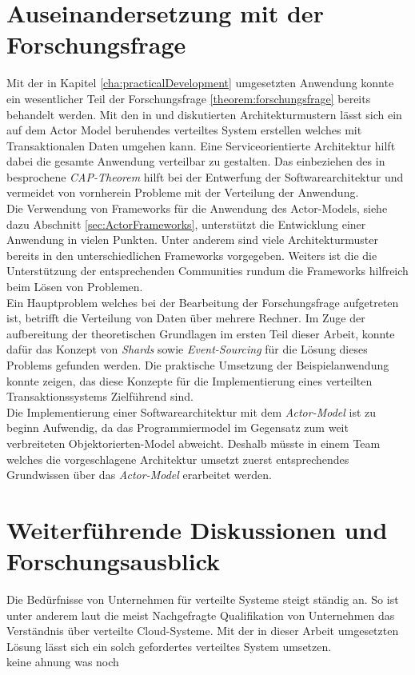 \section{Auseinandersetzung mit der Forschungsfrage}
Mit der in Kapitel \ref{cha:practicalDevelopment} umgesetzten Anwendung konnte ein wesentlicher Teil der Forschungsfrage \ref{theorem:forschungsfrage} bereits behandelt werden. Mit den in \cite{Vernon2015ReactiveAkka} und \cite{akkaInAction} diskutierten Architekturmustern lässt sich ein auf dem Actor Model beruhendes verteiltes System erstellen welches mit Transaktionalen Daten umgehen kann. Eine Serviceorientierte Architektur hilft dabei die gesamte Anwendung verteilbar zu gestalten. 
Das einbeziehen des in \cite{gilbertPerspectiveCAPTheorem2012} besprochene \textit{CAP-Theorem} hilft bei der Entwerfung der Softwarearchitektur und vermeidet von vornherein Probleme mit der Verteilung der Anwendung. \\
Die Verwendung von Frameworks für die Anwendung des Actor-Models, siehe dazu Abschnitt \ref{sec:ActorFrameworks}, unterstützt die Entwicklung einer Anwendung in vielen Punkten. Unter anderem sind viele Architekturmuster bereits in den unterschiedlichen Frameworks vorgegeben. Weiters ist die die Unterstützung der entsprechenden Communities rundum die Frameworks hilfreich beim Lösen von Problemen. \\
Ein Hauptproblem welches bei der Bearbeitung der Forschungsfrage aufgetreten ist, betrifft die Verteilung von Daten über mehrere Rechner. Im Zuge der aufbereitung der theoretischen Grundlagen im ersten Teil dieser Arbeit, konnte dafür das Konzept von \textit{Shards} sowie \textit{Event-Sourcing} für die Lösung dieses Problems gefunden werden. Die praktische Umsetzung der Beispielanwendung konnte zeigen, das diese Konzepte für die Implementierung eines verteilten Transaktionssystems Zielführend sind. \\
Die Implementierung einer Softwarearchitektur mit dem \textit{Actor-Model} ist zu beginn Aufwendig, da das Programmiermodel im Gegensatz zum weit verbreiteten Objektorierten-Model abweicht. Deshalb müsste in einem Team welches die vorgeschlagene Architektur umsetzt zuerst entsprechendes Grundwissen über das \textit{Actor-Model} erarbeitet werden. \\


\section{Weiterführende Diskussionen und Forschungsausblick}
Die Bedürfnisse von Unternehmen für verteilte Systeme steigt ständig an. So ist unter anderem laut \cite{theSkillsCompaniesNeedMost} die meist Nachgefragte Qualifikation von Unternehmen das Verständnis über verteilte Cloud-Systeme. Mit der in dieser Arbeit umgesetzten Lösung lässt sich ein solch gefordertes verteiltes System umsetzen. \\
keine ahnung was noch